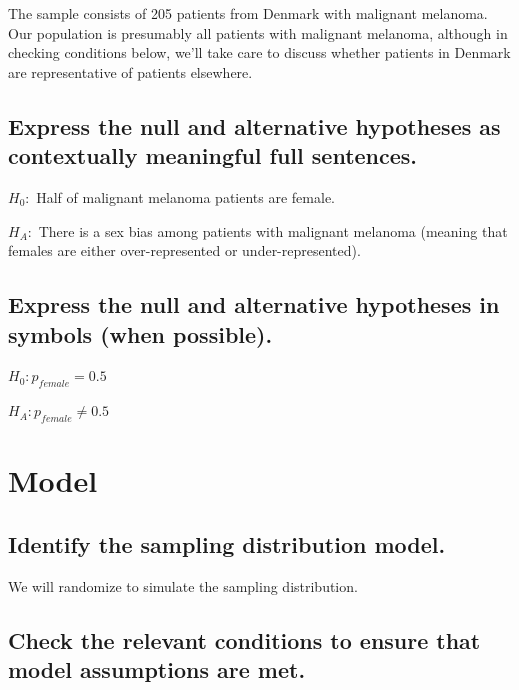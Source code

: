 \documentclass[
]{book}
\begin{document}
The sample consists of 205 patients from Denmark with malignant melanoma. Our population is presumably all patients with malignant melanoma, although in checking conditions below, we'll take care to discuss whether patients in Denmark are representative of patients elsewhere.

\hypertarget{hypothesis2-ex-express-words}{%
\subsection{Express the null and alternative hypotheses as contextually meaningful full sentences.}\label{hypothesis2-ex-express-words}}

\(H_{0}:\) Half of malignant melanoma patients are female.

\(H_{A}:\) There is a sex bias among patients with malignant melanoma (meaning that females are either over-represented or under-represented).

\hypertarget{hypothesis2-ex-express-math}{%
\subsection{Express the null and alternative hypotheses in symbols (when possible).}\label{hypothesis2-ex-express-math}}

\(H_{0}: p_{female} = 0.5\)

\(H_{A}: p_{female} \neq 0.5\)

\hypertarget{hypothesis2-ex-model}{%
\section{Model}\label{hypothesis2-ex-model}}

\hypertarget{hypothesis2-ex-sampling-dist-model}{%
\subsection{Identify the sampling distribution model.}\label{hypothesis2-ex-sampling-dist-model}}

We will randomize to simulate the sampling distribution.

\hypertarget{hypothesis2-ex-ht-conditions}{%
\subsection{Check the relevant conditions to ensure that model assumptions are met.}\label{hypothesis2-ex-ht-conditions}}
\end{document}
